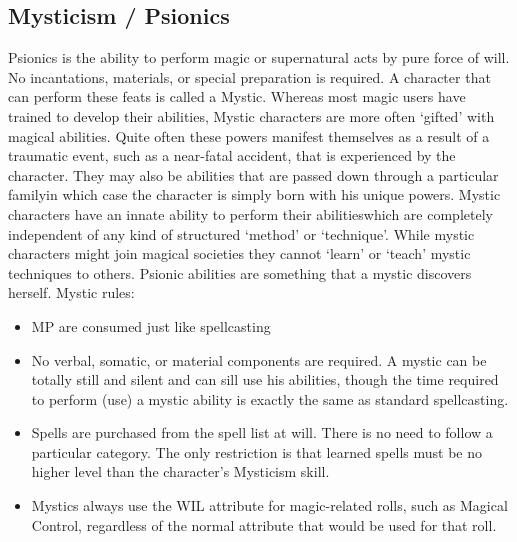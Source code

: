 \documentclass[twoside]{book}
\begin{document}
\subsection{Mysticism / Psionics}
      Psionics is the ability to perform magic or
               supernatural acts by pure force of will. No incantations,
               materials, or special preparation is required. A character
               that can perform these feats is called a Mystic.   Whereas most magic users have trained to develop
               their abilities, Mystic characters are more often
               `gifted' with magical abilities. Quite often
               these powers manifest themselves as a result of a
               traumatic event, such as a near-fatal accident, that is
               experienced by the character. They may also be abilities
               that are passed down through a particular familyin
               which case the character is simply born with his unique
               powers. Mystic characters have an innate ability to
               perform their abilitieswhich are completely
               independent of any kind of structured `method'
               or `technique'. While mystic characters might
               join magical societies they cannot `learn' or
               `teach' mystic techniques to others. Psionic
               abilities are something that a mystic discovers herself.
                 Mystic rules: 
\begin{itemize}
      
  \item   MP are consumed just like spellcasting 
  \item   No verbal, somatic, or material components are
                 required. A mystic can be totally still and silent and
                 can sill use his abilities, though the time required to
                 perform (use) a mystic ability is exactly the same as
                 standard spellcasting. 
  \item   Spells are purchased from the spell list at will.
                 There is no need to follow a particular category. The
                 only restriction is that learned spells must be no
                 higher level than the character's Mysticism skill.
                 
  \item   Mystics always use the WIL attribute for
                 magic-related rolls, such as Magical Control, regardless
                 of the normal attribute that would be used for that
                 roll. 
\end{itemize}
  
\end{document}
